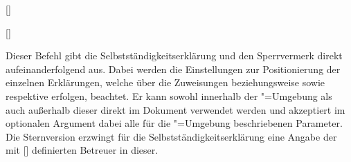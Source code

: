 \begin{Declaration*}{}
\begin{Declaration*}{}
\begin{Declaration*}{}
\begin{Declaration}{[\LParameter]}
\begin{Declaration}[v2.05]{[\LParameter]}
\begin{Declaration}{}
\begin{Declaration}[v2.02]{}
\begin{Declaration}[v2.02]{%
}
\begin{Declaration}[v2.02]{}
\begin{Declaration}{}
\begin{Declaration}{}
\begin{Declaration}{}
\begin{Declaration}{}
\begin{Declaration}{}
\printdeclarationlist%
%
Dieser Befehl gibt die Selbstständigkeitserklärung und den Sperrvermerk direkt 
aufeinanderfolgend aus. Dabei werden die Einstellungen zur Positionierung der 
einzelnen Erklärungen, welche über die Zuweisungen  
beziehungsweise  sowie  
respektive  erfolgen, beachtet. Er kann sowohl 
innerhalb der "=Umgebung als auch außerhalb dieser 
direkt im Dokument verwendet werden und akzeptiert im optionalen Argument dabei 
alle für die "=Umgebung beschriebenen Parameter. 
Die Sternversion erzwingt für die Selbstständigkeitserklärung eine Angabe der 
mit [] definierten Betreuer in dieser.
\end{Declaration}
\end{Declaration}
\end{Declaration}
\end{Declaration}
\end{Declaration}
\end{Declaration}
\end{Declaration}
\end{Declaration}
\end{Declaration}
\end{Declaration}
\end{Declaration}


\end{Declaration*}
\end{Declaration*}
\end{Declaration*}
